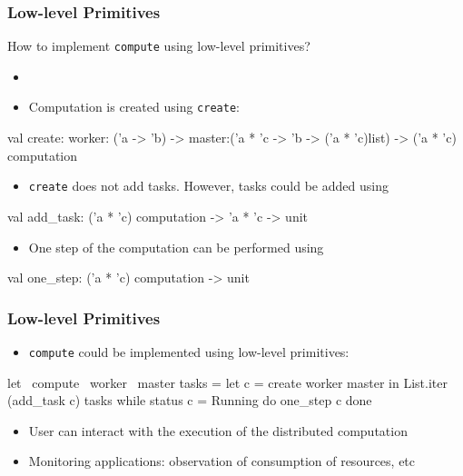 \documentclass[xcolor=dvipsnames,8pt]{beamer}
\begin{document}
\begin{frame}\frametitle {Low-level Primitives}
How to implement \texttt{compute} using low-level primitives?
\begin{itemize}
\item {}
\item Computation is created using \texttt{create}:
\end{itemize}
  \begin{ocaml}
val create: worker: ('a -> 'b) -> 
              master:('a * 'c -> 'b -> ('a * 'c)list) ->
              ('a * 'c) computation
  \end{ocaml}
  \begin{itemize}
  \item \texttt{create} does not add tasks. However, tasks could be added using
  \end{itemize}
  \begin{ocaml}
val add_task: ('a * 'c) computation -> 'a * 'c -> unit
  \end{ocaml}
  \begin{itemize}
  \item One step of the computation can be performed using
  \end{itemize}
\begin{ocaml}
val one_step: ('a * 'c) computation -> unit
\end{ocaml}
\end{frame}


\begin{frame}\frametitle {Low-level Primitives}
  \begin{itemize}
  \item \texttt{compute} could be implemented using low-level primitives:
  \end{itemize}
  \begin{ocaml}
let ~compute ~worker ~master tasks = 
  let c = create worker master in
  List.iter (add_task c) tasks
  while status c = Running do 
     one_step c 
  done    
  \end{ocaml}
  \begin{itemize}
  \item User can interact with the execution of the distributed
    computation
  \item Monitoring applications: observation of consumption of
  resources, etc
  \end{itemize}
\end{frame}
\end{document}
